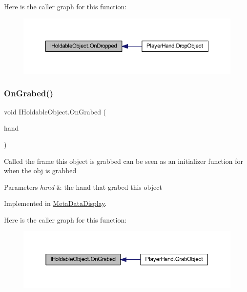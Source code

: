 Here is the caller graph for this function\+:
\nopagebreak
\begin{figure}[H]
\begin{center}
\leavevmode
\includegraphics[width=350pt]{interface_i_holdable_object_a19523673c41505d8533aa50b957e95a1_icgraph}
\end{center}
\end{figure}
\mbox{\label{interface_i_holdable_object_a7b8a42a0c12a26b1668c4dd904f38355}} 
\subsubsection{\texorpdfstring{On\+Grabed()}{OnGrabed()}}
{\footnotesize\ttfamily void I\+Holdable\+Object.\+On\+Grabed (\begin{DoxyParamCaption}\item[{\mbox{\hyperlink{class_player_hand}{Player\+Hand}}}]{hand }\end{DoxyParamCaption})}





Called the frame this object is grabbed can be seen as an initializer function for when the obj is grabbed 


\begin{DoxyParams}{Parameters}
{\em hand} & the hand that grabed this object\\
\hline
\end{DoxyParams}


Implemented in \mbox{\hyperlink{class_meta_data_display_a7d639d7bc58c9340a7f5274884bbc11d}{Meta\+Data\+Display}}.

Here is the caller graph for this function\+:
\nopagebreak
\begin{figure}[H]
\begin{center}
\leavevmode
\includegraphics[width=350pt]{interface_i_holdable_object_a7b8a42a0c12a26b1668c4dd904f38355_icgraph}
\end{center}
\end{figure}
\mbox{\label{interface_i_holdable_object_a6f63fec8fb8f715ad5cdd08aa5ec0ea5}} 
